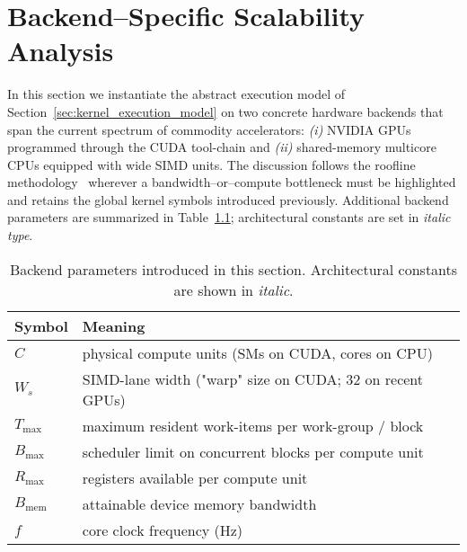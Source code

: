 \chapter{Backend–Specific Scalability Analysis}
\label{sec:backend_scaling}

In this section we instantiate the abstract execution model of
Section~\ref{sec:kernel_execution_model} on two concrete hardware backends that
span the current spectrum of commodity accelerators:
\emph{(i)} NVIDIA GPUs programmed through the CUDA tool-chain and
\emph{(ii)} shared-memory multicore CPUs equipped with wide SIMD units.
The discussion follows the roofline methodology~\cite{Williams2009Roofline}
wherever a bandwidth–or–compute bottleneck must be highlighted and retains the
global kernel symbols introduced previously.  Additional backend parameters
are summarized in Table~\ref{tab:backend_params}; architectural constants are
set in \emph{italic type}.

\begin{table}[t]
  \centering
  \caption{Backend parameters introduced in this section.  Architectural
           constants are shown in \emph{italic}.}
  \label{tab:backend_params}
  \begin{tabular}{ll}
    \toprule
    Symbol & Meaning\\
    \midrule
    $\mathit{C}$         & physical compute units (SMs on CUDA, cores on CPU)\\
    $\mathit{W_s}$       & SIMD-lane width ("warp" size on CUDA; 32 on recent GPUs)\\
    $T_{\max}$           & maximum resident work-items per work-group / block\\
    $B_{\max}$           & scheduler limit on concurrent blocks per compute unit\\
    $R_{\max}$           & registers available per compute unit\\
    $B_{\text{mem}}$     & attainable device memory bandwidth\\
    $f$                  & core clock frequency (Hz)\\
    \bottomrule
  \end{tabular}
\end{table}

